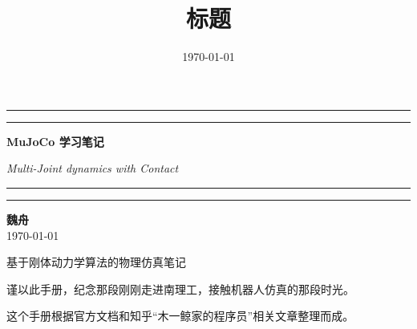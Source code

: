 \documentclass[10pt,a4paper]{book}
\title{标题}
\author{}
\date{\today}
\theoremstyle{thmstyle} %
\theoremstyle{defstyle} %
\theoremstyle{prostyle} %
\begin{document}
	
	\begin{titlepage}
		\centering
		
		\vspace*{3cm}
		
		\rule{\textwidth}{1pt}\par
		\vspace{0.2cm}
		\rule{\textwidth}{3pt}\par
		
		\vspace{1.5cm}
		
		{\Huge \bfseries MuJoCo 学习笔记 \par}
		\vspace{0.5cm}
		{\Large \itshape Multi-Joint dynamics with Contact \par}
		
		\vspace{1.5cm}
		
		\rule{\textwidth}{3pt}\par
		\vspace{0.2cm}
		\rule{\textwidth}{1pt}\par
		
		\vspace{2.5cm}
		
		\begin{flushright}
			{\Large \textbf{魏舟} } \\
			\vspace{0.5cm}
			{\large \today}
		\end{flushright}
		
		\vfill
		
		{\color{gray} \footnotesize 基于刚体动力学算法的物理仿真笔记}
		
	\end{titlepage}
		谨以此手册，纪念那段刚刚走进南理工，接触机器人仿真的那段时光。
		
		这个手册根据官方文档和知乎“木一鲸家的程序员”相关文章整理而成。
	\frontmatter

	\tableofcontents
	
	\mainmatter
	
	
	
	
\end{document}
